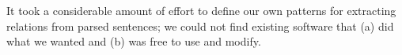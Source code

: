It took a considerable amount of effort to define our own patterns for extracting relations from parsed sentences;
we could not find existing software that (a) did what we wanted and (b) was free to use and modify.
